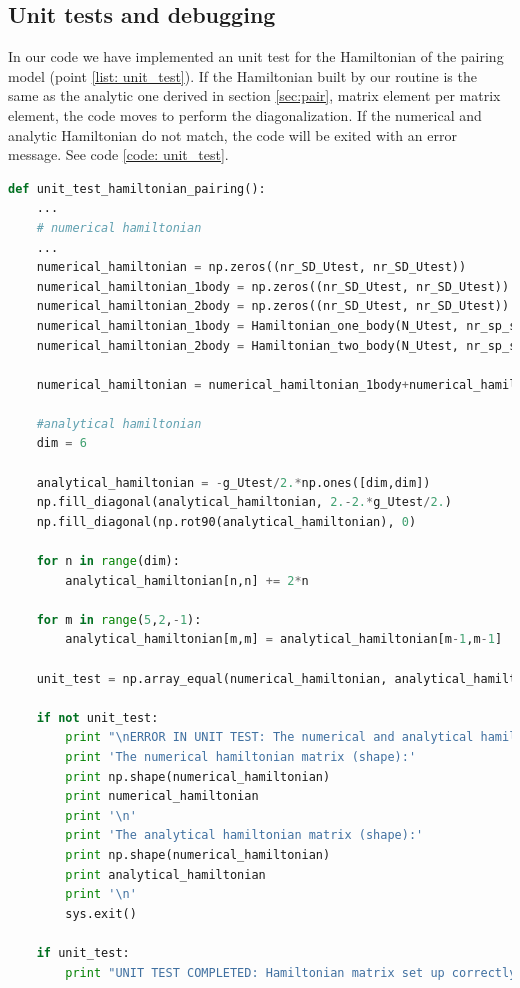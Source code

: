 \documentclass[twoside]{article}
\begin{document}
\subsection{Unit tests and debugging}

In our code we have implemented an unit test for the Hamiltonian of the pairing model (point \ref{list: unit_test}). If the Hamiltonian built by our routine is the same as the analytic one derived in section \ref{sec:pair}, matrix element per matrix element, the code moves to perform the diagonalization. If the numerical and analytic Hamiltonian do not match, the code will be exited with an error message. See code \ref{code: unit_test}.

\begin{lstlisting}[language=Python, label=code: unit_test, caption= \texttt{unit\_test\_hamiltonian\_pairing()} is a unit test run by \texttt{main.py} before it starts to set up the actual Hamiltonian matrix. The unit test is only for the pairing model and compares the analytic and the numerical Hamiltonian element-wise and exits the code if they do not match. ]
def unit_test_hamiltonian_pairing():
    ... 
    # numerical hamiltonian
    ...
    numerical_hamiltonian = np.zeros((nr_SD_Utest, nr_SD_Utest))
    numerical_hamiltonian_1body = np.zeros((nr_SD_Utest, nr_SD_Utest))
    numerical_hamiltonian_2body = np.zeros((nr_SD_Utest, nr_SD_Utest))
    numerical_hamiltonian_1body = Hamiltonian_one_body(N_Utest, nr_sp_states_Utest, sp_matrix_Utest, SD_filename_Utest)
    numerical_hamiltonian_2body = Hamiltonian_two_body(N_Utest, nr_sp_states_Utest, SD_filename_Utest, tbme_filename_Utest, 'pairing')

    numerical_hamiltonian = numerical_hamiltonian_1body+numerical_hamiltonian_2body

    #analytical hamiltonian
    dim = 6
    
    analytical_hamiltonian = -g_Utest/2.*np.ones([dim,dim])
    np.fill_diagonal(analytical_hamiltonian, 2.-2.*g_Utest/2.)
    np.fill_diagonal(np.rot90(analytical_hamiltonian), 0)

    for n in range(dim):
        analytical_hamiltonian[n,n] += 2*n

    for m in range(5,2,-1):
        analytical_hamiltonian[m,m] = analytical_hamiltonian[m-1,m-1]

    unit_test = np.array_equal(numerical_hamiltonian, analytical_hamiltonian)

    if not unit_test:
        print "\nERROR IN UNIT TEST: The numerical and analytical hamiltonian matrix are not equal!\n"
        print 'The numerical hamiltonian matrix (shape):'
        print np.shape(numerical_hamiltonian)
        print numerical_hamiltonian
        print '\n'
        print 'The analytical hamiltonian matrix (shape):'
        print np.shape(numerical_hamiltonian)
        print analytical_hamiltonian
        print '\n'
        sys.exit()
        
    if unit_test:
        print "UNIT TEST COMPLETED: Hamiltonian matrix set up correctly.\n"
\end{lstlisting}
\end{document}
